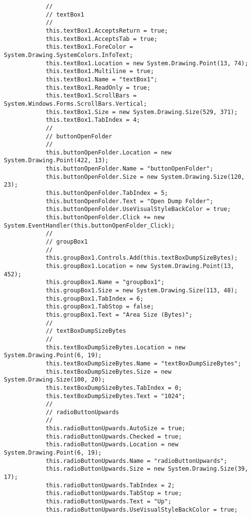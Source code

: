 \begin{lstlisting}
            // 
            // textBox1
            // 
            this.textBox1.AcceptsReturn = true;
            this.textBox1.AcceptsTab = true;
            this.textBox1.ForeColor = System.Drawing.SystemColors.InfoText;
            this.textBox1.Location = new System.Drawing.Point(13, 74);
            this.textBox1.Multiline = true;
            this.textBox1.Name = "textBox1";
            this.textBox1.ReadOnly = true;
            this.textBox1.ScrollBars = System.Windows.Forms.ScrollBars.Vertical;
            this.textBox1.Size = new System.Drawing.Size(529, 371);
            this.textBox1.TabIndex = 4;
            // 
            // buttonOpenFolder
            // 
            this.buttonOpenFolder.Location = new System.Drawing.Point(422, 13);
            this.buttonOpenFolder.Name = "buttonOpenFolder";
            this.buttonOpenFolder.Size = new System.Drawing.Size(120, 23);
            this.buttonOpenFolder.TabIndex = 5;
            this.buttonOpenFolder.Text = "Open Dump Folder";
            this.buttonOpenFolder.UseVisualStyleBackColor = true;
            this.buttonOpenFolder.Click += new System.EventHandler(this.buttonOpenFolder_Click);
            // 
            // groupBox1
            // 
            this.groupBox1.Controls.Add(this.textBoxDumpSizeBytes);
            this.groupBox1.Location = new System.Drawing.Point(13, 452);
            this.groupBox1.Name = "groupBox1";
            this.groupBox1.Size = new System.Drawing.Size(113, 48);
            this.groupBox1.TabIndex = 6;
            this.groupBox1.TabStop = false;
            this.groupBox1.Text = "Area Size (Bytes)";
            // 
            // textBoxDumpSizeBytes
            // 
            this.textBoxDumpSizeBytes.Location = new System.Drawing.Point(6, 19);
            this.textBoxDumpSizeBytes.Name = "textBoxDumpSizeBytes";
            this.textBoxDumpSizeBytes.Size = new System.Drawing.Size(100, 20);
            this.textBoxDumpSizeBytes.TabIndex = 0;
            this.textBoxDumpSizeBytes.Text = "1024";
            // 
            // radioButtonUpwards
            // 
            this.radioButtonUpwards.AutoSize = true;
            this.radioButtonUpwards.Checked = true;
            this.radioButtonUpwards.Location = new System.Drawing.Point(6, 19);
            this.radioButtonUpwards.Name = "radioButtonUpwards";
            this.radioButtonUpwards.Size = new System.Drawing.Size(39, 17);
            this.radioButtonUpwards.TabIndex = 2;
            this.radioButtonUpwards.TabStop = true;
            this.radioButtonUpwards.Text = "Up";
            this.radioButtonUpwards.UseVisualStyleBackColor = true;

\end{lstlisting}
